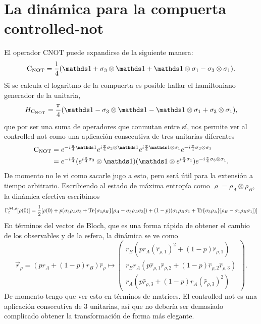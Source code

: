 \section{La dinámica para la compuerta controlled-not}
El operador \textsc{CNOT} puede expandirse de la siguiente manera:
\begin{equation*}
        \cnot=\frac{1}{4}(\Id+\pauli{3}\otimes\Id+\Id\otimes\pauli{1}-\pauli{3}\otimes\pauli{1}).
\end{equation*}
Si se calcula el logaritmo de la compuerta es posible hallar el hamiltoniano generador de la unitaria,
\begin{equation*}
    H_{\cnot}=\frac{\pi}{4}\qty(\Id-\pauli{3}\otimes\Id-\Id\otimes\pauli{1}+\pauli{3}\otimes\pauli{1}),
\end{equation*}
que por ser una suma de operadores que conmutan entre sí, nos permite ver al controlled not como una aplicación consecutiva de tres unitarias diferentes
\begin{align*}
    \cnot&=e^{-i\frac{\pi}{4}\Id}e^{i\frac{\pi}{4}\pauli{3}\otimes\Id}e^{i\frac{\pi}{4}\Id\otimes\pauli{1}}e^{-i\frac{\pi}{4}\pauli{3}\otimes\pauli{1}}\\
    &=e^{-i\frac{\pi}{4}} (e^{i\frac{\pi}{4}\pauli{3}}\otimes \Id) (\Id \otimes e^{i\frac{\pi}{4}\pauli{1}}) e^{-i\frac{\pi}{4}\pauli{3}\otimes\pauli{1}}.
\end{align*}
De momento no le vi como sacarle jugo a esto, pero será útil para la extensión a tiempo arbitrario.
Escribiendo al estado de máxima entropía como $\varrho=\rho_{A}\otimes\rho_{B}$, la dinámica efectiva escribimos
\begin{equation*}
    \Gamma_{t}^{\mathcal{M},\rho}[\rho(0)]=\frac{1}{2}[\rho(0)+p(\sigma_{3}\rho_{A}\sigma_{3}+\Tr{\sigma_{1}\rho_{B}}[\rho_{A}-\sigma_{3}\rho_{A}\sigma_{3}])+(1-p)(\sigma_{1}\rho_{B}\sigma_{1}+\Tr{\sigma_{3}\rho_{A}}[\rho_{B}-\sigma_{1}\rho_{B}\sigma_{1}])]
\end{equation*}
En términos del vector de Bloch, que es una forma rápida de obtener el cambio de los observables y de la esfera, la dinámica se ve como
\begin{equation*}
    \vec{r}_{\rho}=(pr_{A}+(1-p)r_{B})\hat{r}_{\rho}\mapsto\begin{pmatrix}
        r_{B}(pr_{A}(\hat{r}_{\rho,1})^2+(1-p)\hat{r}_{\rho,1})\\
        r_{B}r_{A}(p\hat{r}_{\rho,1}\hat{r}_{\rho,2}+(1-p)\hat{r}_{\rho,2}\hat{r}_{\rho,3})\\
        r_{A}(p\hat{r}_{\rho,3}+(1-p)r_{A}(\hat{r}_{\rho,3})^{2})
    \end{pmatrix}.
  \end{equation*}
  De momento tengo que ver esto en términos de matrices. El controlled not es una aplicación consecutiva de 3 unitarias, así que no debería ser demasiado complicado obtener la transformación de forma más elegante.


